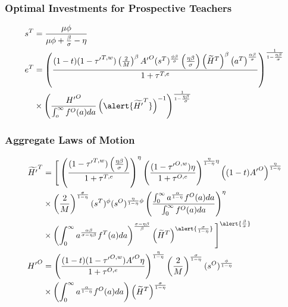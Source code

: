\documentclass[11pt]{beamer}
\begin{document}
\begin{frame}
\frametitle{Optimal Investments for Prospective Teachers} 
\begin{align}
s^{T} & = \frac{\mu \phi}{\mu \phi+\frac{\beta}{\sigma}-\eta} \nonumber\\
e^{T} & = \left( \frac{(1-t)(1-{\tau'}^{T,w})\left(\tfrac{2}{M}\right)^\beta {A'}^O (s^{T})^\frac{\phi \beta}{\sigma} \left(\tfrac{\eta \beta}{\sigma}\right) \left(\widetilde{H}^T\right)^\beta \left(a^{T}\right)^\frac{\alpha \beta}{\sigma}}{1+\tau^{T,e}} \right)^\frac{1}{1-\frac{\eta\beta}{\sigma}} \nonumber\\
& \times \left(\frac{{H'}^O}{\int_o^\infty f^O(a) da}\left(\alert{\widetilde{H'}^{T}}\right)^{-1}\right)^\frac{1}{1-\frac{\eta\beta}{\sigma}} \nonumber
\end{align}
\end{frame}

\begin{frame}
\frametitle{Aggregate Laws of Motion} 
\begin{align}
\widetilde{H'}^{T} & = \Bigg[ \left(\frac{(1-{\tau'}^{T,w})\left(\tfrac{\eta \beta}{\sigma}\right)}{1+\tau^{T,e}} \right)^\eta \left(\frac{(1-{\tau'}^{O,w}) \eta}{1+\tau^{O,e}} \right)^{\frac{\eta}{1-\eta} \eta} \left((1-t){A'}^O \right)^\frac{\eta}{1-\eta}\nonumber\\
& \times  \left(\frac{2}{M}\right)^\frac{\sigma}{1-\eta} (s^{T})^\phi (s^{O})^{\frac{\eta}{1-\eta}\phi} \left(\frac{\int_0^\infty a^\frac{\alpha}{1-\eta} f^O(a) da}{\int_0^\infty f^O(a) da} \right)^\eta
 \nonumber\\
& \times  \left(\int_0^\infty a^\frac{\alpha\beta}{\sigma-\eta\beta} f^T(a) da\right)^{\frac{\sigma-\eta\beta}{\beta}} \left(\widetilde{H}^T\right)^{\alert{\frac{\sigma}{1-\eta}}} \Bigg]^{\alert{\frac{\beta}{\sigma}}} \nonumber\\
{H'}^{O} & = \left( \frac{(1-t)(1-{\tau'}^{O,w}){A'}^O \eta}{1+\tau^{O,e}}\right)^{\frac{\eta}{1-\eta}} \left(\frac{2}{M}\right)^\frac{\sigma}{1-\eta} (s^{O})^\frac{\phi}{1-\eta} \nonumber\\
& \times \left(\int_0^\infty a^\frac{\alpha}{1-\eta} f^O(a) da\right) \left(\widetilde{H}^T\right)^\frac{\sigma}{1-\eta} \nonumber
\end{align}
\end{frame}
\end{document}
